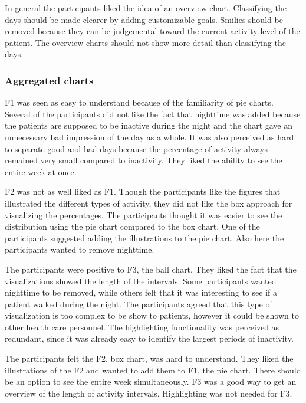 In general the participants liked the idea of an overview chart. Classifying the days should be made clearer by adding customizable goals. Smilies should be removed because they can be judgemental toward the current activity level of the patient. The overview charts should not show more detail than classifying the days.

\subsubsection{Aggregated charts}
F1 was seen as easy to understand because of the familiarity of pie charts. Several of the participants did not like the fact that nighttime was added because the patients are supposed to be inactive during the night and the chart gave an unnecessary bad impression of the day as a whole. It was also perceived as hard to separate good and bad days because the percentage of activity always remained very small compared to inactivity. They liked the ability to see the entire week at once.

F2 was not as well liked as F1. Though the participants like the figures that illustrated the different types of activity, they did not like the box approach for visualizing the percentages. The participants thought it was easier to see the distribution using the pie chart compared to the box chart. One of the participants suggested adding the illustrations to the pie chart. Also here the participants wanted to remove nighttime.

The participants were positive to F3, the ball chart. They liked the fact that the visualizations showed the length of the intervals. Some participants wanted nighttime to be removed, while others felt that it was interesting to see if a patient walked during the night. The participants agreed that this type of visualization is too complex to be show to patients, however it could be shown to other health care personnel. The highlighting functionality was perceived as redundant, since it was already easy to identify the largest periods of inactivity.

The participants felt the F2, box chart, was hard to understand. They liked the illustrations of the F2 and wanted to add them to F1, the pie chart. There should be an option to see the entire week simultaneously. F3 was a good way to get an overview of the length of activity intervals. Highlighting was not needed for F3.

